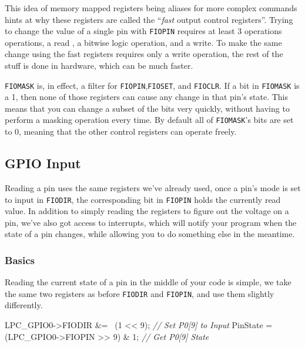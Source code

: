 \documentclass[]{article}
\newenvironment{Shaded}{\begin{snugshade}}{\end{snugshade}}
\newcommand{\DecValTok}[1]{\textcolor[rgb]{0.00,0.00,0.81}{{#1}}}
\newcommand{\CommentTok}[1]{\textcolor[rgb]{0.56,0.35,0.01}{\textit{{#1}}}}
\newcommand{\NormalTok}[1]{{#1}}
\begin{document}
This idea of memory mapped registers being aliases for more complex
commands hints at why these registers are called the ``\emph{fast}
output control registers''. Trying to change the value of a single pin
with \texttt{FIOPIN} requires at least 3 operations operations, a read ,
a bitwise logic operation, and a write. To make the same change using
the fast registers requires only a write operation, the rest of the
stuff is done in hardware, which can be much faster.

\texttt{FIOMASK} is, in effect, a filter for
\texttt{FIOPIN},\texttt{FIOSET}, and \texttt{FIOCLR}. If a bit in
\texttt{FIOMASK} is a 1, then none of those registers can cause any
change in that pin's state. This means that you can change a subset of
the bits very quickly, without having to perform a masking operation
every time. By default all of \texttt{FIOMASK}'s bits are set to 0,
meaning that the other control registers can operate freely.

\subsection{GPIO Input}

Reading a pin uses the same registers we've already used, once a pin's
mode is set to input in \texttt{FIODIR}, the corresponding bit in
\texttt{FIOPIN} holds the currently read value. In addition to simply
reading the registers to figure out the voltage on a pin, we've also got
access to interrupts, which will notify your program when the state of a
pin changes, while allowing you to do something else in the meantime.

\subsubsection{Basics}

Reading the current state of a pin in the middle of your code is simple,
we take the same two registers as before \texttt{FIODIR} and
\texttt{FIOPIN}, and use them slightly differently.

\begin{Shaded}
\begin{Highlighting}[]
    \NormalTok{LPC_GPIO0->FIODIR &= ~(}\DecValTok{1} \NormalTok{<< }\DecValTok{9}\NormalTok{);          }\CommentTok{// Set P0[9] to Input}
    \NormalTok{PinState = (LPC_GPIO0->FIOPIN >> }\DecValTok{9}\NormalTok{) & }\DecValTok{1}\NormalTok{; }\CommentTok{// Get P0[9] State}
\end{Highlighting}
\end{Shaded}
\end{document}
